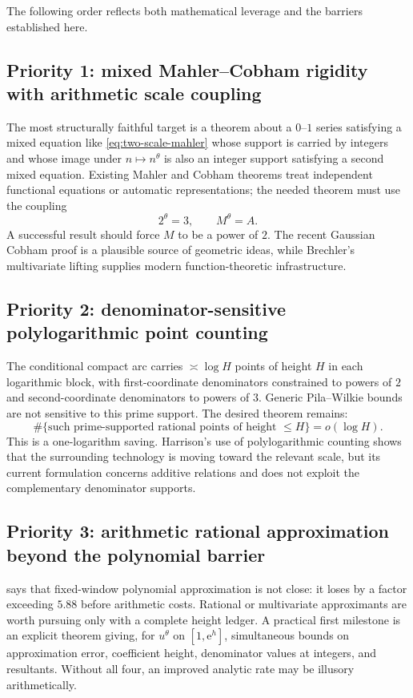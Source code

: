 \documentclass[11pt,oneside]{article}
\theoremstyle{definition}
\theoremstyle{remark}
\newcommand{\e}{\mathrm e}
\begin{document}
The following order reflects both mathematical leverage and the barriers established here.

\subsection{Priority 1: mixed Mahler--Cobham rigidity with arithmetic scale coupling}

The most structurally faithful target is a theorem about a $0$--$1$ series satisfying a mixed equation like \eqref{eq:two-scale-mahler} whose support is carried by integers and whose image under $n\mapsto n^\theta$ is also an integer support satisfying a second mixed equation.  Existing Mahler and Cobham theorems treat independent functional equations or automatic representations; the needed theorem must use the coupling
\[
  2^\theta=3,\qquad M^\theta=A.
\]
A successful result should force $M$ to be a power of $2$.  The recent Gaussian Cobham proof is a plausible source of geometric ideas, while Brechler's multivariate lifting supplies modern function-theoretic infrastructure.

\subsection{Priority 2: denominator-sensitive polylogarithmic point counting}

The conditional compact arc carries $\asymp\log H$ points of height $H$ in each logarithmic block, with first-coordinate denominators constrained to powers of $2$ and second-coordinate denominators to powers of $3$.  Generic Pila--Wilkie bounds are not sensitive to this prime support.  The desired theorem remains:
\[
 \#\{\text{such prime-supported rational points of height }\le H\}=o(\log H).
\]
This is a one-logarithm saving.  Harrison's use of polylogarithmic counting shows that the surrounding technology is moving toward the relevant scale, but its current formulation concerns additive relations and does not exploit the complementary denominator supports.

\subsection{Priority 3: arithmetic rational approximation beyond the polynomial barrier}

 says that fixed-window polynomial approximation is not close: it loses by a factor exceeding $5.88$ before arithmetic costs.  Rational or multivariate approximants are worth pursuing only with a complete height ledger.  A practical first milestone is an explicit theorem giving, for $u^\theta$ on $[1,\e^h]$, simultaneous bounds on approximation error, coefficient height, denominator values at integers, and resultants.  Without all four, an improved analytic rate may be illusory arithmetically.
\end{document}
